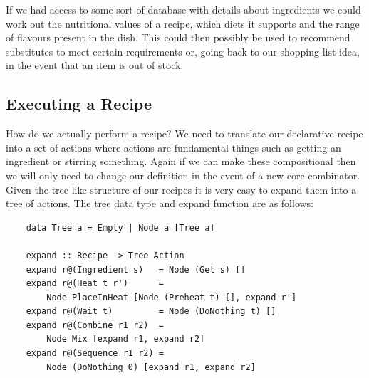 \documentclass[11pt]{article}
\begin{document}
    If we had access to some sort of database with details about ingredients we could
    work out the nutritional values of a recipe, which diets it supports and the range
    of flavours present in the dish. This could then possibly be used to recommend
    substitutes to meet certain requirements or, going back to our shopping list idea,
    in the event that an item is out of stock. \\

    \subsection{Executing a Recipe}

    How do we actually perform a recipe? We need to translate our declarative
    recipe into a set of actions where actions are fundamental things such as
    getting an ingredient or stirring something. Again if we can make these
    compositional then we will only need to change our definition in the event
    of a new core combinator. Given the tree like structure of our recipes it
    is very easy to expand them into a tree of actions. The tree data type and
    expand function are as follows:
    \begin{tt}
    \small
    \begin{lstlisting}
    data Tree a = Empty | Node a [Tree a]

    expand :: Recipe -> Tree Action
    expand r@(Ingredient s)   = Node (Get s) []
    expand r@(Heat t r')      =
        Node PlaceInHeat [Node (Preheat t) [], expand r']
    expand r@(Wait t)         = Node (DoNothing t) []
    expand r@(Combine r1 r2)  =
        Node Mix [expand r1, expand r2]
    expand r@(Sequence r1 r2) =
        Node (DoNothing 0) [expand r1, expand r2]
    \end{lstlisting}
    \end{tt}

\end{document}
